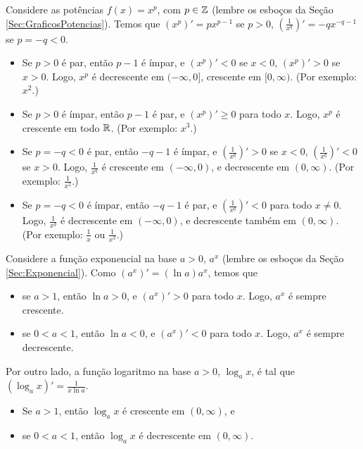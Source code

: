 \begin{ex}
Considere as potências $f(x)=x^p$, com $p\in \mathbb{Z}$ (lembre os esboços da Seção
\ref{Sec:GraficosPotencias}). Temos que $(x^p)'=px^{p-1}$ se $p>0$,
$(\frac{1}{x^q})'=-qx^{-q-1}$ se $p=-q<0$.
\begin{itemize}
\item Se $p>0$ é par, então $p-1$ é ímpar, e $(x^p)'<0$ se $x<0$,
$(x^p)'>0$ se $x>0$. Logo, $x^p$ é decrescente em $(-\infty, 0]$,
crescente em $[0,\infty)$. (Por exemplo: $x^2$.)
\item Se $p>0$ é ímpar, então $p-1$ é par, e $(x^p)'\geq 0$ para todo
$x$. Logo, $x^p$ é crescente em todo $\mathbb{R}$. (Por exemplo: $x^3$.)
\item Se $p=-q<0$ é par, então $-q-1$ é ímpar, e $(\frac{1}{x^q})'>0$
se $x<0$, $(\frac{1}{x^q})'<0$ se $x>0$. 
Logo, $\frac{1}{x^q}$ é crescente em $(-\infty, 0)$, e decrescente em
$(0,\infty)$. (Por exemplo: $\frac{1}{x^2}$.)
\item Se $p=-q<0$ é ímpar, então $-q-1$ é par, e $(\frac{1}{x^q})'<0$
para todo $x\neq 0$.
Logo, $\frac{1}{x^q}$ é decrescente em $(-\infty, 0)$, e decrescente também em
$(0,\infty)$. (Por exemplo: $\frac{1}{x}$ ou $\frac{1}{x^3}$.)
\end{itemize}
\end{ex}


\begin{ex}
Considere a função exponencial na base $a>0$, $a^x$ (lembre os esboços da Seção
\ref{Sec:Exponencial}). Como $(a^x)'=(\ln a)a^x$, temos que
\begin{itemize}
 \item se $a>1$, então $\ln a>0$, e $(a^x)'>0$ para todo $x$. Logo, $a^x$ é
sempre crescente.
 \item se $0<a<1$, então $\ln a<0$, e $(a^x)'<0$ para todo $x$. Logo, $a^x$ é
sempre decrescente.
\end{itemize}
Por outro lado, a função logaritmo na base $a>0$, $\log_ax$, é tal que
$(\log_ax)'=\frac{1}{x\ln a}$. 
\begin{itemize}
 \item Se $a>1$, então $\log_ax$ é crescente em $(0,\infty)$, e
 \item se $0<a<1$, então $\log_ax$ é decrescente em $(0,\infty)$.
\end{itemize}
\end{ex}



